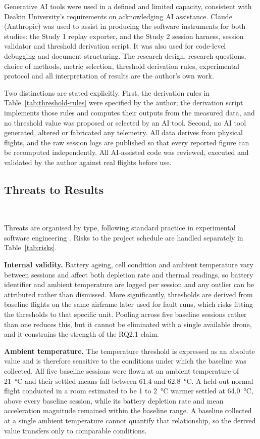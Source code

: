 Generative AI tools were used in a defined and limited capacity, consistent with
Deakin University's requirements on acknowledging AI assistance. Claude
(Anthropic) was used to assist in producing the software instruments for both
studies: the Study 1 replay exporter, and the Study 2 session harness, session
validator and threshold derivation script. It was also used for code-level
debugging and document structuring. The research design, research questions,
choice of methods, metric selection, threshold derivation rules, experimental
protocol and all interpretation of results are the author's own work.

Two distinctions are stated explicitly. First, the derivation rules in
Table~\ref{tab:threshold-rules} were specified by the author; the derivation
script implements those rules and computes their outputs from the measured data,
and no threshold value was proposed or selected by an AI tool. Second, no AI tool
generated, altered or fabricated any telemetry. All data derives from physical
flights, and the raw session logs are published so that every reported figure can
be recomputed independently. All AI-assisted code was reviewed, executed and
validated by the author against real flights before use.

\subsection{Threats to Results}~\label{subsec:method-threats}

Threats are organised by type, following standard practice in experimental
software engineering \citep{wohlin2012}. Risks to the project schedule are
handled separately in Table~\ref{tab:risks}.

\noindent\textbf{Internal validity.} Battery ageing, cell condition and ambient
temperature vary between sessions and affect both depletion rate and thermal
readings, so battery identifier and ambient temperature are logged per session
and any outlier can be attributed rather than dismissed. More significantly,
thresholds are derived from baseline flights on the same airframe later used for
fault runs, which risks fitting the thresholds to that specific unit. Pooling
across five baseline sessions rather than one reduces this, but it cannot be
eliminated with a single available drone, and it constrains the strength of the
RQ2.1 claim.

\noindent\textbf{Ambient temperature.} The temperature threshold is expressed as
an absolute value and is therefore sensitive to the conditions under which the
baseline was collected. All five baseline sessions were flown at an ambient
temperature of \SI{21}{\celsius} and their settled means fall between
\SI{61.4}{} and \SI{62.8}{\celsius}. A held-out normal flight conducted in a
room estimated to be \SI{1}{} to \SI{2}{\celsius} warmer settled at
\SI{64.0}{\celsius}, above every baseline session, while its battery depletion
rate and mean acceleration magnitude remained within the baseline range. A
baseline collected at a single ambient temperature cannot quantify that
relationship, so the derived value transfers only to comparable conditions.

